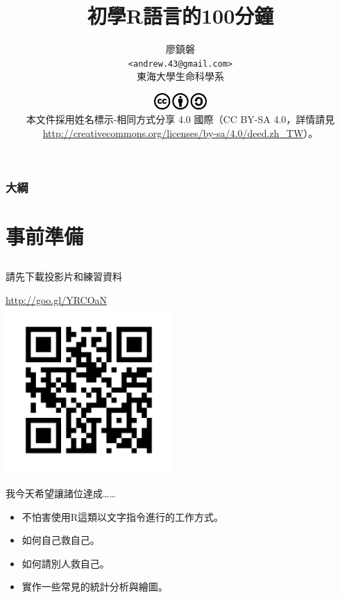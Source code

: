 \documentclass[12pt]{beamer}
\title[初學者學習R語言]{初學R語言的100分鐘}
\author[廖鎮磐]{廖鎮磐 \\ \texttt{<andrew.43@gmail.com>}\\ 東海大學生命科學系}
\institute{\normalsize 2015年台灣生態研究網年會 \\ \footnotesize 2015年3月14日於蓮華池研究中心}
\date{\scriptsize \includegraphics[width=2cm]{cc.pdf}\\
本文件採用姓名標示-相同方式分享 4.0 國際（CC BY-SA 4.0，詳情請見 \url{http://creativecommons.org/licenses/by-sa/4.0/deed.zh_TW}）。}
\begin{document}
\begin{frame}
\titlepage
\end{frame}

\begin{frame}
\frametitle{大綱}
\tableofcontents
\end{frame}

\section{事前準備}\subsection{}


\begin{frame}{請先下載投影片和練習資料}
\begin{center}
\Huge\url{http://goo.gl/YRCOaN}\\
\includegraphics[width=2.5in]{url-dropbox.pdf}
\end{center}
\end{frame}

\begin{frame}{我今天希望讓諸位達成\ldots\ldots}
\begin{itemize}
\item 不怕害使用R這類以文字指令進行的工作方式。
\item 如何自己救自己。
\item 如何請別人救自己。
\item 實作一些常見的統計分析與繪圖。
\end{itemize}
\end{frame}
\end{document}
